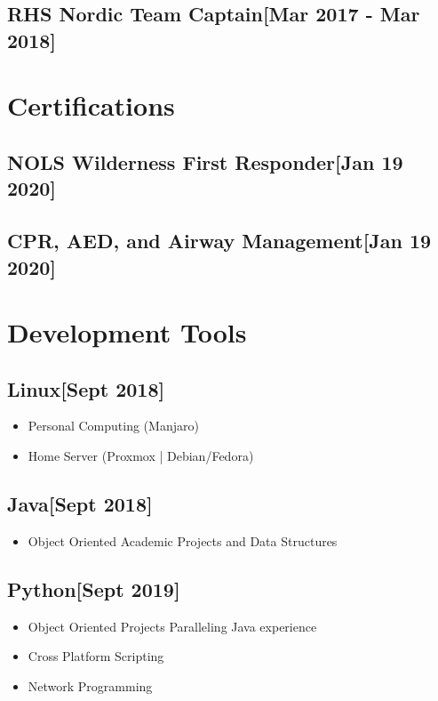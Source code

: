 \documentclass{article}
\begin{document}
    \subsection{\textbf{RHS Nordic Team Captain}\hfill[Mar 2017 - Mar 2018]}

\section{Certifications}

    \subsection{\textbf{NOLS Wilderness First Responder}\hfill[Jan 19 2020]}

    \subsection{\textbf{CPR, AED, and Airway Management}\hfill[Jan 19 2020]}

\section{Development Tools}

    \subsection{\textbf{Linux}\hfill[Sept 2018]}
        \begin{itemize}
            \item Personal Computing (Manjaro)
            \item Home Server (Proxmox | Debian/Fedora)
        \end{itemize}

    \subsection{\textbf{Java}\hfill{[Sept 2018]}}
        \begin{itemize}
            \item Object Oriented Academic Projects and Data Structures
        \end{itemize}

    \subsection{\textbf{Python}\hfill{[Sept 2019]}}
        \begin{itemize}
            \item Object Oriented Projects Paralleling Java experience
            \item Cross Platform Scripting
            \item Network Programming
        \end{itemize}
\end{document}
